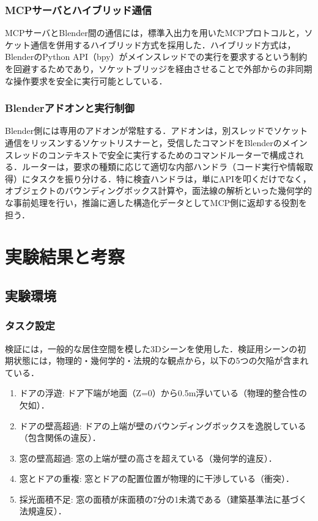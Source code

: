 \documentclass[dvipdfmx, a4paper, 9pt]{deimj}
\begin{document}
\subsubsection{MCPサーバとハイブリッド通信}

MCPサーバとBlender間の通信には，標準入出力を用いたMCPプロトコルと，ソケット通信を併用するハイブリッド方式を採用した．ハイブリッド方式は，BlenderのPython API（bpy）がメインスレッドでの実行を要求するという制約を回避するためであり，ソケットブリッジを経由させることで外部からの非同期な操作要求を安全に実行可能としている．

\subsubsection{Blenderアドオンと実行制御}

Blender側には専用のアドオンが常駐する．アドオンは，別スレッドでソケット通信をリッスンするソケットリスナーと，受信したコマンドをBlenderのメインスレッドのコンテキストで安全に実行するためのコマンドルーターで構成される．ルーターは，要求の種類に応じて適切な内部ハンドラ（コード実行や情報取得）にタスクを振り分ける．特に検査ハンドラは，単にAPIを叩くだけでなく，オブジェクトのバウンディングボックス計算や，面法線の解析といった幾何学的な事前処理を行い，推論に適した構造化データとしてMCP側に返却する役割を担う．

\section{実験結果と考察}

\subsection{実験環境}

\subsubsection{タスク設定}

検証には，一般的な居住空間を模した3Dシーンを使用した．検証用シーンの初期状態には，物理的・幾何学的・法規的な観点から，以下の5つの欠陥が含まれている．

\begin{enumerate}
  \item ドアの浮遊: ドア下端が地面（Z=0）から0.5m浮いている（物理的整合性の欠如）．
  \item ドアの壁高超過: ドアの上端が壁のバウンディングボックスを逸脱している（包含関係の違反）．
  \item 窓の壁高超過: 窓の上端が壁の高さを超えている（幾何学的違反）．
  \item 窓とドアの重複: 窓とドアの配置位置が物理的に干渉している（衝突）．
  \item 採光面積不足: 窓の面積が床面積の7分の1未満である（建築基準法に基づく法規違反）．
\end{enumerate}
\end{document}

